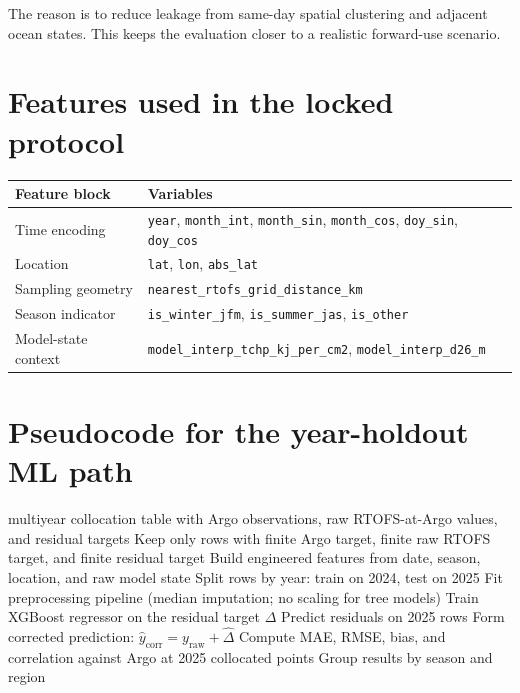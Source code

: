 \documentclass[11pt]{report}
\newcommand{\code}[1]{\texttt{#1}}
\begin{document}
The reason is to reduce leakage from same-day spatial clustering and adjacent ocean states. This keeps the evaluation closer to a realistic forward-use scenario.

\section{Features used in the locked protocol}
\begin{table}[H]
\centering
\begin{tabular}{p{} p{}}
\toprule
\textbf{Feature block} & \textbf{Variables} \\
\midrule
Time encoding & \code{year}, \code{month\_int}, \code{month\_sin}, \code{month\_cos}, \code{doy\_sin}, \code{doy\_cos} \\
Location & \code{lat}, \code{lon}, \code{abs\_lat} \\
Sampling geometry & \code{nearest\_rtofs\_grid\_distance\_km} \\
Season indicator & \code{is\_winter\_jfm}, \code{is\_summer\_jas}, \code{is\_other} \\
Model-state context & \code{model\_interp\_tchp\_kj\_per\_cm2}, \code{model\_interp\_d26\_m} \\
\bottomrule
\end{tabular}
\end{table}

\section{Pseudocode for the year-holdout ML path}
\begin{algorithm}[H]
\caption{2024-train / 2025-test XGBoost correction}
\begin{algorithmic}[1]
\Require multiyear collocation table with Argo observations, raw RTOFS-at-Argo values, and residual targets
\State Keep only rows with finite Argo target, finite raw RTOFS target, and finite residual target
\State Build engineered features from date, season, location, and raw model state
\State Split rows by year: train on 2024, test on 2025
\State Fit preprocessing pipeline (median imputation; no scaling for tree models)
\State Train XGBoost regressor on the residual target \(\Delta\)
\State Predict residuals on 2025 rows
\State Form corrected prediction: \(\widehat{y}_{\mathrm{corr}} = y_{\mathrm{raw}} + \widehat{\Delta}\)
\State Compute MAE, RMSE, bias, and correlation against Argo at 2025 collocated points
\State Group results by season and region
\end{algorithmic}
\end{algorithm}
\end{document}
